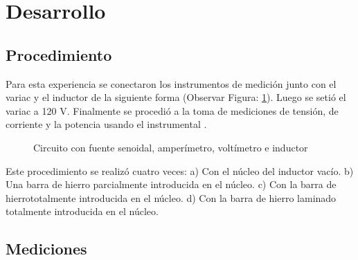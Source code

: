 \documentclass{article}
\begin{document}
    \indent
    \section{Desarrollo}

        \subsection{Procedimiento}

            Para esta experiencia se conectaron los instrumentos de medición junto con el variac y el inductor de la siguiente forma (Observar Figura: \ref{fig:circuito-inductor}). Luego se setió el variac a 120 V. Finalmente se procedió a la toma de mediciones de tensión, de corriente y la potencia usando el instrumental . 
            \begin{figure}[h!]
                \centering
                \caption{Circuito con fuente senoidal, amperímetro, voltímetro e inductor}
                \label{fig:circuito-inductor}
            \end{figure}

            Este procedimiento se realizó cuatro veces: a) Con el núcleo del inductor vacío. b) 
            Una barra de hierro parcialmente introducida en el núcleo. c) Con la barra de hierrototalmente introducida 
            en el núcleo. d) Con la barra de hierro laminado totalmente introducida 
            en el núcleo.

        \subsection{Mediciones}
            
\end{document}
